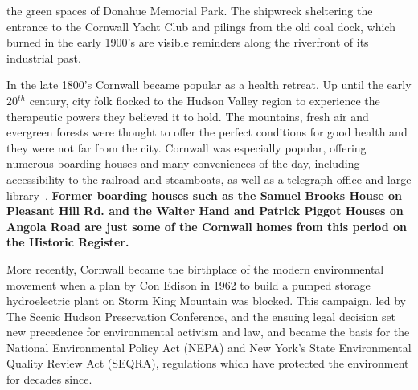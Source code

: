 the green spaces of Donahue Memorial Park. The shipwreck sheltering the 
entrance to the Cornwall Yacht Club and pilings from the old coal dock, which 
burned in the early 1900's are visible reminders along the riverfront of its 
industrial past.
\par
In the late 1800's Cornwall became popular as a health retreat. Up until the 
early 20$^{th}$ century, city folk flocked to the Hudson Valley region to experience 
the therapeutic powers they believed it to hold. The mountains, fresh air and 
evergreen forests were thought to offer the perfect conditions for good health 
and they were not far from the city. Cornwall was especially popular, offering 
numerous boarding houses and many conveniences of the day, including 
accessibility to the railroad and steamboats, as well as a telegraph office and 
large library~\citep{ruttenber1881}. \textbf{Former boarding houses such as the 
Samuel Brooks House on Pleasant Hill Rd. and the Walter Hand and Patrick Piggot
Houses on Angola Road are just some of the Cornwall homes from this period on 
the Historic Register.}
\par
More recently, Cornwall became the birthplace of the modern environmental 
movement when a plan by Con Edison in 1962 to build a pumped storage 
hydroelectric plant on Storm King Mountain was blocked. This campaign, led by 
The Scenic Hudson Preservation Conference, and the ensuing legal decision set 
new precedence for environmental activism and law, and became the basis for the 
National Environmental Policy Act (NEPA) and New York's State Environmental 
Quality Review Act (SEQRA), regulations which have protected the environment 
for decades since.

\label{map:historicandculturalresources}
